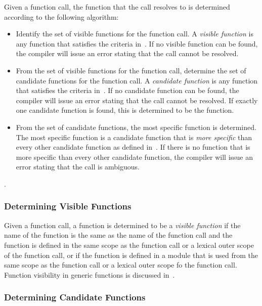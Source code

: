 Given a function call, the function that the call resolves to is
determined according to the following algorithm:
\begin{itemize}
\item
Identify the set of visible functions for the function call.  A
\emph{visible function} is any function that satisfies the criteria
in~.  If no visible function can
be found, the compiler will issue an error stating that the call
cannot be resolved.
\item
From the set of visible functions for the function call, determine the
set of candidate functions for the function call.  A \emph{candidate
function} is any function that satisfies the criteria
in~.  If no candidate function
can be found, the compiler will issue an error stating that the call
cannot be resolved.  If exactly one candidate function is found, this
is determined to be the function.
\item
From the set of candidate functions, the most specific function is
determined.  The most specific function is a candidate function that
is \emph{more specific} than every other candidate function as defined
in~.  If there is no
function that is more specific than every other candidate function,
the compiler will issue an error stating that the call is ambiguous.
\end{itemize}.

\subsubsection{Determining Visible Functions}
\label{Determining_Visible_Functions}

Given a function call, a function is determined to be a \emph{visible
function} if the name of the function is the same as the name of the
function call and the function is defined in the same scope as the
function call or a lexical outer scope of the function call, or if the
function is defined in a module that is used from the same scope as
the function call or a lexical outer scope fo the function call.
Function visibility in generic functions is discussed
in~.

\subsubsection{Determining Candidate Functions}
\label{Determining_Candidate_Functions}


